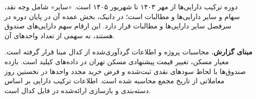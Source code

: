 \documentclass[12pt,a4paper]{article}
\begin{document}
دوره ترکیب دارایی‌ها از مهر ۱۴۰۳ تا شهریور ۱۴۰۵ است. «سایر» شامل وجه نقد، سهام و سایر دارایی‌ها و مطالبات است؛ در دانیک، بخش عمده آن در پایان دوره در سرفصل سایر دارایی‌ها و مطالبات قرار دارد. این ارقام سهم دارایی‌های صندوق هستند، نه سهمی از تعداد واحدهای آن.

\textbf{مبنای گزارش.} محاسبات پروژه و اطلاعات گردآوری‌شده از کدال مبنا قرار گرفته است. معیار مسکن، تغییر قیمت پیشنهادی مسکن تهران در داده‌های کیلید است. بازده صندوق‌ها با لحاظ سودهای نقدی ثبت‌شده و فرض خرید مجدد واحدها در نخستین روز معاملاتی از تاریخ مجمع محاسبه شده است. اطلاعات ترکیب دارایی بر اساس دسته‌بندی و بازسازی ارائه‌شده در فایل کدال است.
\end{document}
